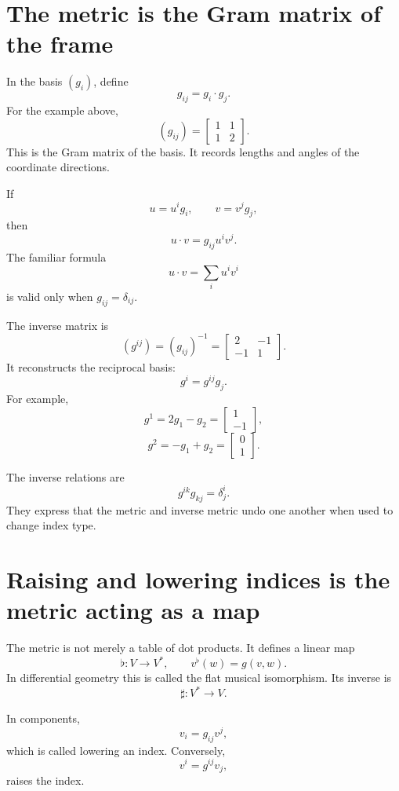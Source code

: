 \section{The metric is the Gram matrix of the frame}

In the basis \((g_i)\), define
\[
  g_{ij}=g_i\cdot g_j.
\]
For the example above,
\[
  (g_{ij})=
  \begin{bmatrix}
    1&1\\
    1&2
  \end{bmatrix}.
\]
This is the Gram matrix of the basis.  It records lengths and angles of the coordinate directions.

If
\[
  u=u^ig_i,
  \qquad
  v=v^jg_j,
\]
then
\[
  u\cdot v=g_{ij}u^iv^j.
\]
The familiar formula
\[
  u\cdot v=\sum_i u^iv^i
\]
is valid only when \(g_{ij}=\delta_{ij}\).

The inverse matrix is
\[
  (g^{ij})=(g_{ij})^{-1}
  =
  \begin{bmatrix}
    2&-1\\
    -1&1
  \end{bmatrix}.
\]
It reconstructs the reciprocal basis:
\[
  g^i=g^{ij}g_j.
\]
For example,
\[
  g^1=2g_1-g_2
  =
  \begin{bmatrix}1\\-1\end{bmatrix},
\]
\[
  g^2=-g_1+g_2
  =
  \begin{bmatrix}0\\1\end{bmatrix}.
\]

The inverse relations are
\[
  g^{ik}g_{kj}=\delta^i_j.
\]
They express that the metric and inverse metric undo one another when used to change index type.

\section{Raising and lowering indices is the metric acting as a map}

The metric is not merely a table of dot products.  It defines a linear map
\[
  \flat:V\longrightarrow V^*,
  \qquad
  v^\flat(w)=g(v,w).
\]
In differential geometry this is called the flat musical isomorphism.  Its inverse is
\[
  \sharp:V^*\longrightarrow V.
\]

In components,
\[
  v_i=g_{ij}v^j,
\]
which is called lowering an index.  Conversely,
\[
  v^i=g^{ij}v_j,
\]
raises the index.

